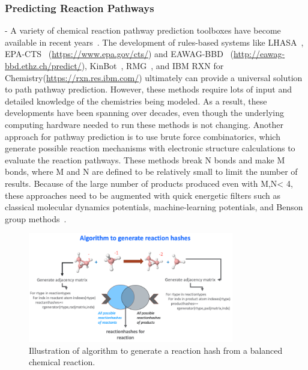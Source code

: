 \documentclass[runningheads,a4paper]{llncs}
\begin{document}
\subsubsection{Predicting Reaction Pathways} - 
A variety of chemical reaction pathway prediction toolboxes have become available in recent years~\cite{pensak1977lhasa,karp2002pathway,socorro2005robia,yang2017automatic,stocker2020machine,gao2016reaction,doi:10.1021/acs.energyfuels.0c03843,rappoport2019predicting}.  The development of rules-based systems like LHASA~\cite{pensak1977lhasa}, EPA-CTS~\cite{wolfe2016chemical} (\url{https://www.epa.gov/cts/}) and EAWAG-BBD~\cite{wicker2010predicting} (\url{http://eawag-bbd.ethz.ch/predict/}), KinBot~\cite{zador2013kinbot,van2020kinbot}, RMG~\cite{suleimanov2015automated}, and IBM RXN for Chemistry(\url{https://rxn.res.ibm.com/}) ultimately can provide a universal solution to path pathway prediction.  However, these methods require lots of input and detailed knowledge of the chemistries being modeled.  As a result, these developments have been spanning over decades, even though the underlying computing hardware needed to run these methods is not changing.  Another approach for pathway prediction is to use brute force combinatorics, which generate possible reaction mechanisms with electronic structure calculations to evaluate the reaction pathways. These methods break N bonds and make M bonds, where M and N are defined to be relatively small to limit the number of results. Because of the large number of products produced even with M,N< 4, these approaches need to be augmented with quick energetic filters such as classical molecular dynamics potentials, machine-learning potentials, and Benson group methods~\cite{suleimanov2015automated}. 

\begin{figure}[!H]
\includegraphics[angle=90,width=0.8\textwidth]{images/gerhash.png}
\caption{Illustration of algorithm to generate a reaction hash from a balanced chemical reaction.}
\label{fig.arrows.reactionhashes}
\end{figure}
\end{document}
